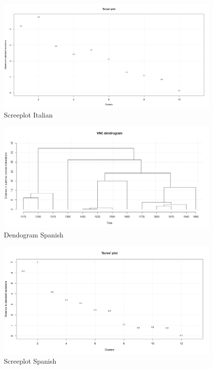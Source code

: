 \documentclass[
]{article}
\begin{document}
\begin{figure}
\centering
\includegraphics{ita_scree_apr25.jpeg}
\caption{Screeplot Italian}
\end{figure}

\begin{figure}
\centering
\includegraphics{es_dendro_apr25.jpeg}
\caption{Dendogram Spanish}
\end{figure}

\begin{figure}
\centering
\includegraphics{es_scree_apr25.jpeg}
\caption{Screeplot Spanish}
\end{figure}
\end{document}
